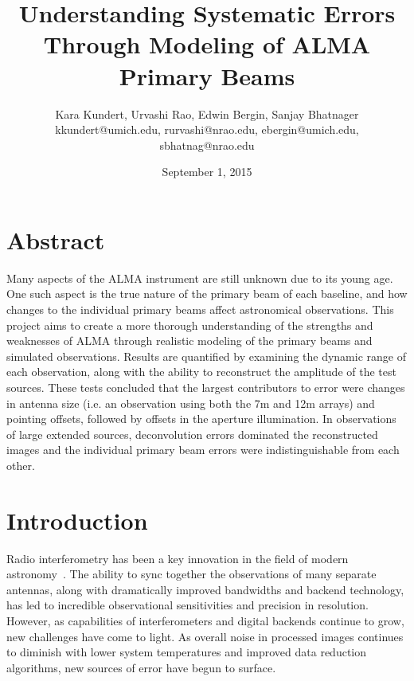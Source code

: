 \documentclass[11pt]{article}
\makeatletter
\newcommand{\thetitle}{Understanding Systematic Errors Through Modeling of ALMA 
Primary Beams}
\newcommand{\theauthor}{Kara Kundert, Urvashi Rao, Edwin Bergin, Sanjay 
Bhatnager}
\newcommand{\theauthorsemail}{kkundert@umich.edu, rurvashi@nrao.edu, 
ebergin@umich.edu, sbhatnag@nrao.edu}
\newcommand{\thedate}{September 1, 2015}
\makeatother
\begin{document}
\title{
    \sffamily\bfseries\huge
    \thetitle \\
}
\author{
    \sffamily\theauthor \\
    \sffamily\theauthorsemail \\
}
\date{\thedate}
\maketitle
\sloppy

\section{Abstract}

Many aspects of the ALMA instrument are still unknown due to its young age.
One such aspect is the true nature of the primary beam of each baseline, and
how changes to the individual primary beams affect astronomical
observations. This project aims to create a more thorough
understanding of the strengths and weaknesses of ALMA through realistic
modeling of the primary beams and simulated observations. Results are
quantified by examining the dynamic range of each observation, along with the
ability to reconstruct the amplitude of the test sources. These tests
concluded that the largest contributors to error were changes in antenna
size (i.e. an observation using both the 7m and 12m arrays) and pointing
offsets, followed by offsets in the aperture illumination. In observations of 
large extended sources, deconvolution errors dominated the reconstructed images 
and the individual primary beam errors were indistinguishable from each other.

\section{Introduction}

Radio interferometry has been a key innovation in the field of modern 
astronomy~\cite{swenson-mathur}.  The ability to sync together the observations 
of many separate antennas, along with dramatically improved bandwidths and 
backend technology, has led to incredible observational sensitivities and 
precision in resolution.  However, as capabilities of interferometers and 
digital backends continue to grow, new challenges have come to light. As 
overall noise in processed images continues to diminish with lower system 
temperatures and improved data reduction algorithms, new sources of error have 
begun to surface. 
\end{document}
